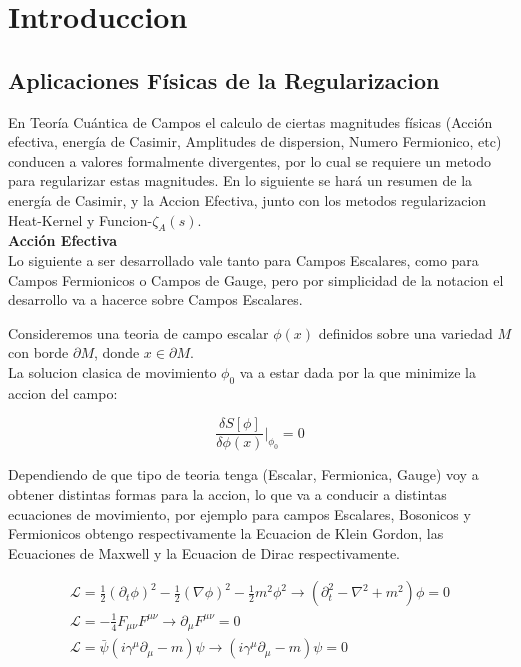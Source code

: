 \chapter{Introduccion}


\section{Aplicaciones Físicas de la Regularizacion}

En Teoría Cuántica de Campos el calculo de ciertas magnitudes físicas (Acción efectiva, energía de Casimir, Amplitudes de dispersion, Numero Fermionico, etc) conducen a valores formalmente divergentes, por lo cual se requiere un metodo para regularizar estas magnitudes. En lo siguiente se hará un resumen de la energía de Casimir, y la Accion Efectiva, junto con los metodos regularizacion Heat-Kernel y Funcion-$ \zeta _A (s) $.\\





\textbf{Acción Efectiva}\\

Lo siguiente a ser desarrollado vale tanto para Campos Escalares, como para Campos Fermionicos o Campos de Gauge, pero por simplicidad de la notacion el desarrollo va a hacerce sobre Campos Escalares.

Consideremos una teoria de campo escalar $\phi(x)$ definidos sobre una variedad $M$ con borde $\partial M$, donde $x \in \partial M$. \\

La solucion clasica de movimiento $ \phi _0 $ va a estar dada por la que minimize la accion del campo:

\begin{equation}
\frac{\delta S [ \phi ] }{\delta \phi (x)} | _{\phi _0} = 0
\end{equation}


Dependiendo de que tipo de teoria tenga (Escalar, Fermionica, Gauge) voy a obtener distintas formas para la accion, lo que va a conducir a distintas ecuaciones de movimiento, por ejemplo para campos Escalares, Bosonicos y Fermionicos obtengo respectivamente la Ecuacion de Klein Gordon, las Ecuaciones de Maxwell y la Ecuacion de Dirac respectivamente.

\begin{equation}
\begin{array}{c}
\mathscr{L} = \frac{1}{2} (\partial _t \phi ) ^2 - \frac{1}{2} ( \nabla \phi ) ^2 - \frac{1}{2} m ^2 \phi ^2 
\rightarrow 
\left(
	\partial _t ^2 - \nabla ^2 + m^2 
		\right) \phi = 0 \\
\mathscr{L} = - \frac{1}{4} F _{\mu \nu} F ^{\mu \nu}
\rightarrow \partial _{\mu} F ^{\mu \nu} = 0
 \\
\mathscr{L} = { \bar{\psi} } \left(
			i \gamma ^{\mu} \partial _{\mu} - m 
			\right) \psi 
\rightarrow
			\left( i \gamma ^{\mu} \partial _{\mu}  - m   \right)\psi = 0
\end{array}
\end{equation}




